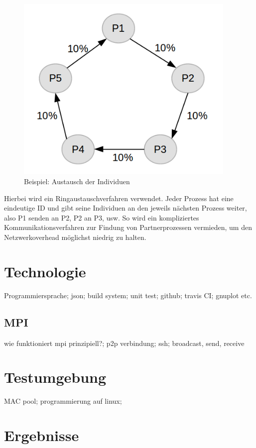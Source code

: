 \documentclass[12pt,a4paper]{scrreprt}
\begin{document}
\begin{figure}[ht]
  	\centering
	\includegraphics[width=300pt]{images/algo_06_exchange.png}
	\caption{Beispiel: Austausch der Individuen}
	\label{fig:algo-sample-exchange}
\end{figure}

Hierbei wird ein Ringaustauschverfahren verwendet. Jeder Prozess hat eine eindeutige ID und gibt seine Individuen an den jeweils nächsten Prozess  weiter, also P1 senden an P2, P2 an P3, usw. So wird ein kompliziertes Kommunikationsverfahren zur Findung von Partnerprozessen vermieden, um den Netzwerkoverhead möglichst niedrig zu halten.

\chapter{Technologie}
\label{chap:technologie}

Programmiersprache; json; build system; unit test; github; travis CI; gnuplot etc.

\section{MPI}
\label{sec:mpi}

wie funktioniert mpi prinzipiell?; p2p verbindung; ssh; broadcast, send, receive 

\chapter{Testumgebung}
\label{chap:testumgebung}

MAC pool; programmierung auf linux;

\chapter{Ergebnisse}
\label{chap:ergebnisse}

\clearpage
{}
\lstlistoflistings
{}
\listoffigures
\listoftables


\end{document}
